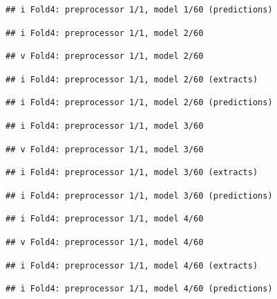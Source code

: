 \documentclass[
]{article}
\begin{document}
\begin{verbatim}
## i Fold4: preprocessor 1/1, model 1/60 (predictions)
\end{verbatim}

\begin{verbatim}
## i Fold4: preprocessor 1/1, model 2/60
\end{verbatim}

\begin{verbatim}
## v Fold4: preprocessor 1/1, model 2/60
\end{verbatim}

\begin{verbatim}
## i Fold4: preprocessor 1/1, model 2/60 (extracts)
\end{verbatim}

\begin{verbatim}
## i Fold4: preprocessor 1/1, model 2/60 (predictions)
\end{verbatim}

\begin{verbatim}
## i Fold4: preprocessor 1/1, model 3/60
\end{verbatim}

\begin{verbatim}
## v Fold4: preprocessor 1/1, model 3/60
\end{verbatim}

\begin{verbatim}
## i Fold4: preprocessor 1/1, model 3/60 (extracts)
\end{verbatim}

\begin{verbatim}
## i Fold4: preprocessor 1/1, model 3/60 (predictions)
\end{verbatim}

\begin{verbatim}
## i Fold4: preprocessor 1/1, model 4/60
\end{verbatim}

\begin{verbatim}
## v Fold4: preprocessor 1/1, model 4/60
\end{verbatim}

\begin{verbatim}
## i Fold4: preprocessor 1/1, model 4/60 (extracts)
\end{verbatim}

\begin{verbatim}
## i Fold4: preprocessor 1/1, model 4/60 (predictions)
\end{verbatim}
\end{document}
